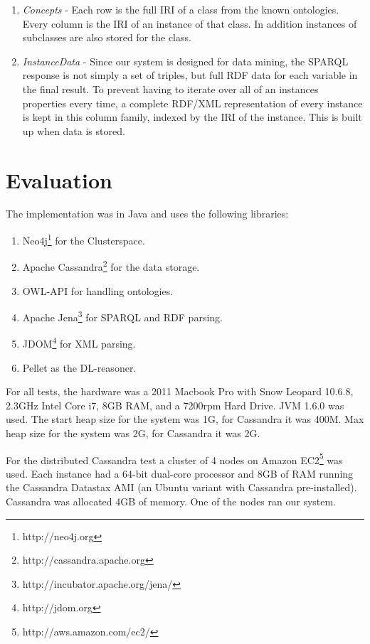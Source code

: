 \documentclass[journal]{IEEEtran}
\begin{document}
\begin{enumerate}
    \item \emph{Concepts} - Each row is the full IRI of a class from the known
        ontologies. Every column is the IRI of an instance of that class. In
        addition instances of subclasses are also stored for the class.

    \item \emph{InstanceData} - Since our system is designed for data mining,
        the SPARQL response is not simply a set of triples, but full RDF data
        for each variable in the final result. To prevent having to iterate
        over all of an instances properties every time, a complete RDF/XML
        representation of every instance is kept in this column family, indexed
        by the IRI of the instance. This is built up when data is stored.

\end{enumerate}

\section{Evaluation}

The implementation was in Java and uses the following libraries:
\begin{enumerate}
    \item Neo4j\footnote{http://neo4j.org} for the Clusterspace.
    \item Apache Cassandra\footnote{http://cassandra.apache.org} for the data storage.
    \item OWL-API\cite{Hor:09} for handling ontologies.
    \item Apache Jena\footnote{http://incubator.apache.org/jena/} for SPARQL and RDF parsing.
    \item JDOM\footnote{http://jdom.org} for XML parsing.
    \item Pellet\cite{Parsia04pellet:an} as the DL-reasoner.
\end{enumerate}

For all tests, the hardware was a 2011 Macbook Pro with Snow Leopard 10.6.8,
2.3GHz Intel Core i7, 8GB RAM, and a 7200rpm Hard Drive.  JVM 1.6.0 was used.
The start heap size for the system was 1G, for Cassandra it was 400M. Max
heap size for the system was 2G, for Cassandra it was 2G.

For the distributed Cassandra test a cluster of 4 nodes on Amazon
EC2\footnote{http://aws.amazon.com/ec2/} was used.  Each instance had a 64-bit
dual-core processor and 8GB of RAM running the Cassandra Datastax AMI (an
Ubuntu variant with Cassandra pre-installed).  Cassandra was allocated 4GB of
memory. One of the nodes ran our system.
\end{document}
